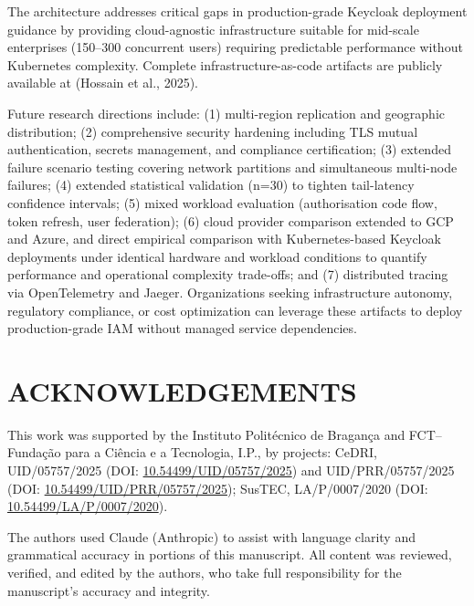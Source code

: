 \documentclass[a4paper,twoside]{article}
\begin{document}
The architecture addresses critical gaps in production-grade Keycloak deployment guidance by providing cloud-agnostic infrastructure suitable for mid-scale enterprises (150--300 concurrent users) requiring predictable performance without Kubernetes complexity. Complete infrastructure-as-code artifacts are publicly available at (Hossain et al., 2025).

Future research directions include: (1) multi-region replication and geographic distribution; (2) comprehensive security hardening including TLS mutual authentication, secrets management, and compliance certification; (3) extended failure scenario testing covering network partitions and simultaneous multi-node failures; (4) extended statistical validation (n=30) to tighten tail-latency confidence intervals; (5) mixed workload evaluation (authorisation code flow, token refresh, user federation); (6) cloud provider comparison extended to GCP and Azure, and direct empirical comparison with Kubernetes-based Keycloak deployments under identical hardware and workload conditions to quantify performance and operational complexity trade-offs; and (7) distributed tracing via OpenTelemetry and Jaeger. Organizations seeking infrastructure autonomy, regulatory compliance, or cost optimization can leverage these artifacts to deploy production-grade IAM without managed service dependencies.

\section*{ACKNOWLEDGEMENTS}

\begin{sloppypar}
This work was supported by the Instituto Polit\'ecnico de Bragan\c{c}a and FCT--\allowbreak{}Funda\c{c}\~ao para a Ci\^encia e a Tecnologia, I.P., by projects: CeDRI, UID/05757/2025 (DOI: \url{10.54499/UID/05757/2025}) and UID/PRR/\allowbreak{}05757/2025 (DOI: \url{10.54499/UID/PRR/05757/2025}); SusTEC, LA/P/0007/2020 (DOI: \url{10.54499/LA/P/0007/2020}).
\end{sloppypar}

The authors used Claude (Anthropic) to assist with language clarity and grammatical accuracy in portions of this manuscript. All content was reviewed, verified, and edited by the authors, who take full responsibility for the manuscript's accuracy and integrity.
\end{document}
